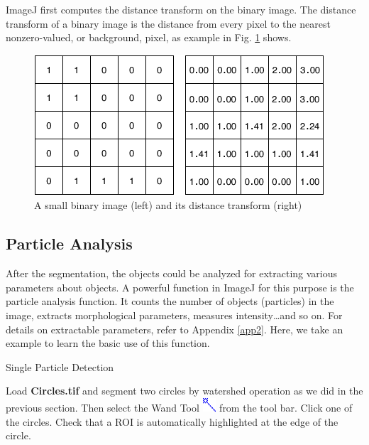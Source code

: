 ImageJ first computes the distance transform on the binary image. The distance transform of
a binary image is the distance from every pixel to the nearest nonzero-valued, or background, pixel, as example in Fig. \ref{fig:img118} shows.
\begin{figure}[htbp]
\begin{center}
\includegraphics[width=10.85cm,height=5.242cm]{fig/CMCIBasicCourse201102-img118.png}
\caption{ A small binary image (left) and its distance transform (right)}
\label{fig:img118}
\end{center}
\end{figure}


\subsection{Particle Analysis}

After the segmentation, the objects could be analyzed for extracting various
parameters about objects. A powerful function in ImageJ for this purpose is the particle
analysis function. It counts the number of objects (particles) in the
image, extracts morphological parameters, measures intensity\ldots and
so on. For details on extractable parameters, refer to Appendix
\ref{app2}. Here, we take an example to learn the basic use of
this function.  

\begin{indentexercise}{1}
Single Particle Detection

Load \textbf{Circles.tif} and segment two circles by watershed operation
as we did in the previous section. Then select the Wand Tool 
\includegraphics[width=0.5cm]{fig/CMCIBasicCourse201102-img119.png}
 from the tool bar. Click one of the circles. Check that a ROI is
automatically highlighted at the edge of the circle.
\end{indentexercise}

